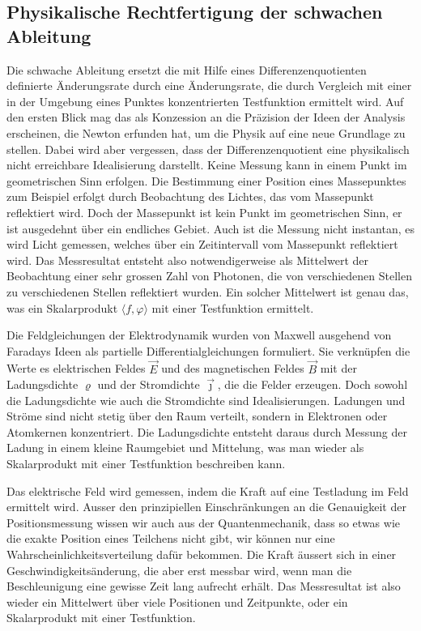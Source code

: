 \subsection{Physikalische Rechtfertigung der schwachen Ableitung}
Die schwache Ableitung ersetzt die mit Hilfe eines Differenzenquotienten
definierte Änderungsrate durch eine Änderungsrate, die durch Vergleich
mit einer in der Umgebung eines Punktes konzentrierten Testfunktion
ermittelt wird.
Auf den ersten Blick mag das als Konzession an die Präzision der Ideen
der Analysis erscheinen, die Newton erfunden hat, um die Physik auf eine
neue Grundlage zu stellen.
Dabei wird aber vergessen, dass der Differenzenquotient eine physikalisch
nicht erreichbare Idealisierung darstellt.
Keine Messung kann in einem Punkt im geometrischen Sinn erfolgen.
Die Bestimmung einer Position eines Massepunktes zum Beispiel erfolgt
durch Beobachtung des Lichtes, das vom Massepunkt reflektiert wird.
Doch der Massepunkt ist kein Punkt im geometrischen Sinn, er ist ausgedehnt
über ein endliches Gebiet.
Auch ist die Messung nicht instantan, es wird Licht gemessen, welches
über ein Zeitintervall vom Massepunkt reflektiert wird.
Das Messresultat entsteht also notwendigerweise als Mittelwert der
Beobachtung einer sehr grossen Zahl von Photonen, die von verschiedenen
Stellen zu verschiedenen Stellen reflektiert wurden.
Ein solcher Mittelwert ist genau das, was ein Skalarprodukt
$\langle f,\varphi\rangle$ mit einer Testfunktion ermittelt.

Die Feldgleichungen der Elektrodynamik wurden von Maxwell ausgehend
von Faradays Ideen als partielle Differentialgleichungen formuliert.
Sie verknüpfen die Werte es elektrischen Feldes $\vec{E}$ und des
magnetischen Feldes $\vec{B}$ mit der Ladungsdichte $\varrho$
und der Stromdichte $\vec{\jmath}$, die die Felder erzeugen.
Doch sowohl die Ladungsdichte wie auch die Stromdichte sind Idealisierungen.
Ladungen und Ströme sind nicht stetig über den Raum verteilt, sondern 
in Elektronen oder Atomkernen konzentriert.
Die Ladungsdichte entsteht daraus durch Messung der Ladung in einem kleine
Raumgebiet und Mittelung, was man wieder als Skalarprodukt mit einer
Testfunktion beschreiben kann.

Das elektrische Feld wird gemessen, indem die Kraft auf eine Testladung
im Feld ermittelt wird.
Ausser den prinzipiellen Einschränkungen an die Genauigkeit der
Positionsmessung wissen wir auch aus der Quantenmechanik, dass so etwas
wie die exakte Position eines Teilchens nicht gibt, wir können nur eine
Wahrscheinlichkeitsverteilung dafür bekommen.
Die Kraft äussert sich in einer Geschwindigkeitsänderung, die aber erst
messbar wird, wenn man die Beschleunigung eine gewisse Zeit lang aufrecht
erhält.
Das Messresultat ist also wieder ein Mittelwert über viele Positionen
und Zeitpunkte, oder ein Skalarprodukt mit einer Testfunktion.


